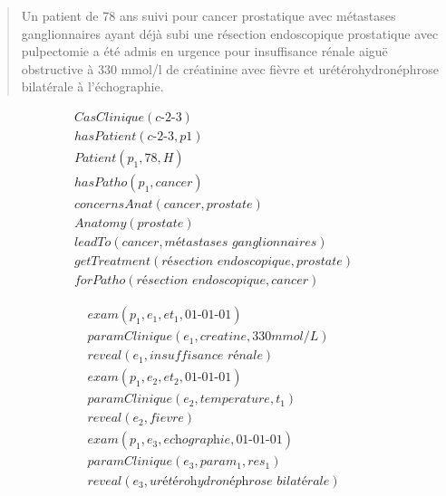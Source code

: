 \begin{quote}
    Un patient de 78 ans suivi pour cancer prostatique avec métastases ganglionnaires ayant déjà subi une résection endoscopique prostatique avec pulpectomie a été admis en urgence pour insuffisance rénale aiguë obstructive à 330 mmol/l de créatinine avec fièvre et urétérohydronéphrose bilatérale à l'échographie.
\end{quote}

\begin{multicols}{2}%
    \small%
\begin{align}
    CasClinique(\textit{c-2-3}) \\
    hasPatient(\textit{c-2-3}, p1) \\
    Patient(p_1, 78, H) \\
    hasPatho(p_1, cancer) \\
    concernsAnat(cancer, prostate) \\
    Anatomy(prostate) \\
    leadTo(cancer, \textit{métastases ganglionnaires}) \\
    getTreatment(\textit{résection endoscopique}, prostate) \\
    forPatho(\textit{résection endoscopique}, cancer)
\end{align}

\begin{align}
    exam(p_1, e_1, et_1, \textit{01-01-01}) \\
    paramClinique(e_1, creatine, \textit{330mmol/L}) \\
    reveal(e_1, \textit{insuffisance rénale}) \\
    exam(p_1, e_2, et_2, \textit{01-01-01}) \\
    paramClinique(e_2, temperature, t_1) \\
    reveal(e_2, fievre) \\
    exam(p_1, e_3, \textit{echographie}, \textit{01-01-01}) \\
    paramClinique(e_3, param_1, res_1) \\
    reveal(e_3, \textit{urétérohydronéphrose bilatérale})
\end{align}
\end{multicols}

